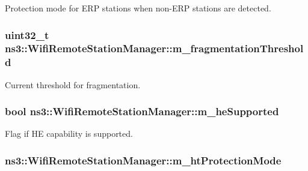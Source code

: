 Protection mode for E\+RP stations when non-\/\+E\+RP stations are detected. 

\subsubsection[{\texorpdfstring{m\+\_\+fragmentation\+Threshold}{m_fragmentationThreshold}}]{\setlength{\rightskip}{0pt plus 5cm}uint32\+\_\+t ns3\+::\+Wifi\+Remote\+Station\+Manager\+::m\+\_\+fragmentation\+Threshold\hspace{0.3cm}{\ttfamily [private]}}\hypertarget{classns3_1_1WifiRemoteStationManager_a120ccbf05266fba8a7878fd913b2fec6}{}\label{classns3_1_1WifiRemoteStationManager_a120ccbf05266fba8a7878fd913b2fec6}


Current threshold for fragmentation. 

\subsubsection[{\texorpdfstring{m\+\_\+he\+Supported}{m_heSupported}}]{\setlength{\rightskip}{0pt plus 5cm}bool ns3\+::\+Wifi\+Remote\+Station\+Manager\+::m\+\_\+he\+Supported\hspace{0.3cm}{\ttfamily [private]}}\hypertarget{classns3_1_1WifiRemoteStationManager_a7ea87a71bac75104db7ec4c0a0c94acc}{}\label{classns3_1_1WifiRemoteStationManager_a7ea87a71bac75104db7ec4c0a0c94acc}


Flag if HE capability is supported. 

\subsubsection[{\texorpdfstring{m\+\_\+ht\+Protection\+Mode}{m_htProtectionMode}}]{ ns3\+::\+Wifi\+Remote\+Station\+Manager\+::m\+\_\+ht\+Protection\+Mode\hspace{0.3cm}{\ttfamily [private]}}\hypertarget{classns3_1_1WifiRemoteStationManager_a1a4afefd1dd2f335ef6b44c3619073cd}{}\label{classns3_1_1WifiRemoteStationManager_a1a4afefd1dd2f335ef6b44c3619073cd}


